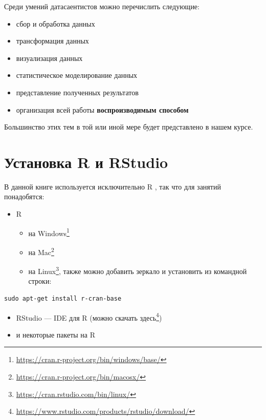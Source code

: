 \documentclass[
]{book}
\providecommand{\tightlist}{%
  \setlength{\itemsep}{0pt}\setlength{\parskip}{0pt}}
\renewcommand{\href}[2]{#2\footnote{\url{#1}}}
\begin{document}
Среди умений датасаентистов можно перечислить следующие:

\begin{itemize}
\tightlist
\item
  сбор и обработка данных
\item
  трансформация данных
\item
  визуализация данных
\item
  статистическое моделирование данных
\item
  представление полученных результатов
\item
  организация всей работы \textbf{воспроизводимым способом}
\end{itemize}

Большинство этих тем в той или иной мере будет представлено в нашем курсе.

\hypertarget{ux443ux441ux442ux430ux43dux43eux432ux43aux430-r-ux438-rstudio}{%
\section{Установка R и RStudio}\label{ux443ux441ux442ux430ux43dux43eux432ux43aux430-r-ux438-rstudio}}

В данной книге используется исключительно R \citep{r_core_team19}, так что для занятий понадобятся:

\begin{itemize}
\tightlist
\item
  R

  \begin{itemize}
  \tightlist
  \item
    \href{https://cran.r-project.org/bin/windows/base/}{на Windows}
  \item
    \href{https://cran.r-project.org/bin/macosx/}{на Mac}
  \item
    \href{https://cran.rstudio.com/bin/linux/}{на Linux}, также можно добавить зеркало и установить из командной строки:
  \end{itemize}
\end{itemize}

\begin{verbatim}
sudo apt-get install r-cran-base
\end{verbatim}

\begin{itemize}
\tightlist
\item
  RStudio --- IDE для R (\href{https://www.rstudio.com/products/rstudio/download/}{можно скачать здесь})
\item
  и некоторые пакеты на R
\end{itemize}
\end{document}
